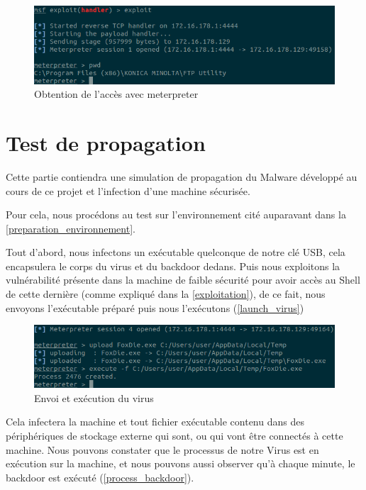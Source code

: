     \begin{figure}[H]
        \centering
        \includegraphics[width=\linewidth]{images/meterpreter.png}
        \caption{Obtention de l'accès avec meterpreter}
        \label{obtention_accees_meterpreter}
    \end{figure}

\section{Test de propagation}
Cette partie contiendra une simulation de propagation du Malware développé au cours de ce projet et 
l'infection d'une machine sécurisée.

Pour cela, nous procédons au test sur l’environnement cité auparavant dans la \autoref{preparation_environnement}.

Tout d'abord, nous infectons un exécutable quelconque de notre clé USB, cela encapsulera le corps du virus et du 
backdoor dedans. Puis nous exploitons la vulnérabilité présente dans la machine de faible sécurité pour avoir 
accès au Shell de cette dernière (comme expliqué dans la \autoref{exploitation}), de ce fait, nous envoyons 
l'exécutable préparé puis nous l’exécutons (\autoref{launch_virus})

\begin{figure}[H]
    \centering
    \includegraphics[width=\linewidth]{images/exec_virus.png}
    \caption{Envoi et exécution du virus}
    \label{launch_virus}
\end{figure}
Cela infectera la machine et tout fichier exécutable contenu dans des périphériques de stockage externe qui sont, ou qui vont  être connectés à cette machine.  Nous pouvons constater que le processus de notre Virus est en exécution sur la machine, et nous pouvons aussi observer qu'à chaque minute, le backdoor est exécuté (\autoref{process_backdoor}).

